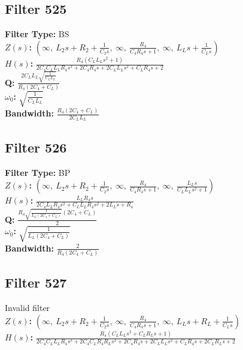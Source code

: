 \documentclass{article}
\begin{document}
\subsection*{Filter 525}
\textbf{Filter Type:} BS \\ 
\textbf{$Z(s)$:} $\left( \infty, \  L_{2} s + R_{2} + \frac{1}{C_{2} s}, \  \infty, \  \frac{R_{4}}{C_{4} R_{4} s + 1}, \  \infty, \  L_{L} s + \frac{1}{C_{L} s}\right)$ \\ 
\textbf{$H(s)$:} $\frac{R_{4} \left(C_{L} L_{L} s^{2} + 1\right)}{2 C_{4} C_{L} L_{L} R_{4} s^{3} + 2 C_{4} R_{4} s + 2 C_{L} L_{L} s^{2} + C_{L} R_{4} s + 2}$ \\ 
\textbf{Q:} $\frac{2 C_{L} L_{L} \sqrt{\frac{1}{C_{L} L_{L}}}}{R_{4} \left(2 C_{4} + C_{L}\right)}$ \\ 
\textbf{$\omega_0$:} $\sqrt{\frac{1}{C_{L} L_{L}}}$ \\ 
\textbf{Bandwidth:} $\frac{R_{4} \left(2 C_{4} + C_{L}\right)}{2 C_{L} L_{L}}$ \\ 
\subsection*{Filter 526}
\textbf{Filter Type:} BP \\ 
\textbf{$Z(s)$:} $\left( \infty, \  L_{2} s + R_{2} + \frac{1}{C_{2} s}, \  \infty, \  \frac{R_{4}}{C_{4} R_{4} s + 1}, \  \infty, \  \frac{L_{L} s}{C_{L} L_{L} s^{2} + 1}\right)$ \\ 
\textbf{$H(s)$:} $\frac{L_{L} R_{4} s}{2 C_{4} L_{L} R_{4} s^{2} + C_{L} L_{L} R_{4} s^{2} + 2 L_{L} s + R_{4}}$ \\ 
\textbf{Q:} $\frac{R_{4} \sqrt{\frac{1}{L_{L} \left(2 C_{4} + C_{L}\right)}} \left(2 C_{4} + C_{L}\right)}{2}$ \\ 
\textbf{$\omega_0$:} $\sqrt{\frac{1}{L_{L} \left(2 C_{4} + C_{L}\right)}}$ \\ 
\textbf{Bandwidth:} $\frac{2}{R_{4} \left(2 C_{4} + C_{L}\right)}$ \\ 
\subsection*{Filter 527}
Invalid filter \\ 
\textbf{$Z(s)$:} $\left( \infty, \  L_{2} s + R_{2} + \frac{1}{C_{2} s}, \  \infty, \  \frac{R_{4}}{C_{4} R_{4} s + 1}, \  \infty, \  L_{L} s + R_{L} + \frac{1}{C_{L} s}\right)$ \\ 
\textbf{$H(s)$:} $\frac{R_{4} \left(C_{L} L_{L} s^{2} + C_{L} R_{L} s + 1\right)}{2 C_{4} C_{L} L_{L} R_{4} s^{3} + 2 C_{4} C_{L} R_{4} R_{L} s^{2} + 2 C_{4} R_{4} s + 2 C_{L} L_{L} s^{2} + C_{L} R_{4} s + 2 C_{L} R_{L} s + 2}$ \\ 
\end{document}
